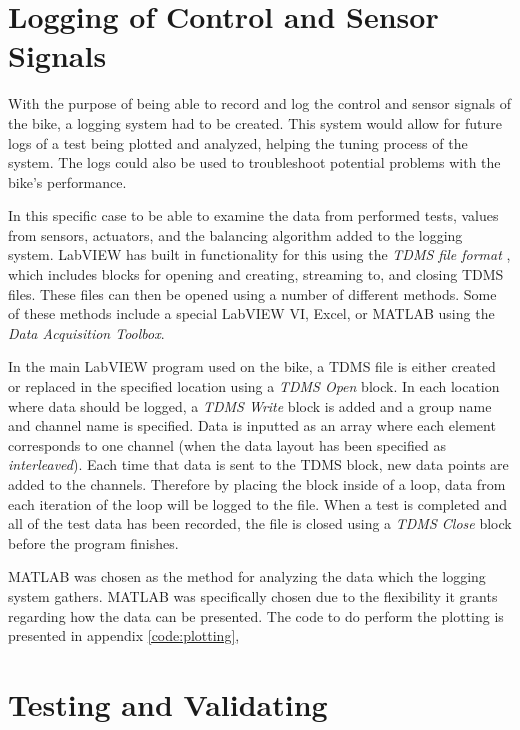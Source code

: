 \section{Logging of Control and Sensor Signals} \label{method:logging}

With the purpose of being able to record and log the control and sensor signals of the bike, a logging system had to be created. This system would allow for future logs of a test being plotted and analyzed, helping the tuning process of the system. The logs could also be used to troubleshoot potential problems with the bike's performance.

In this specific case to be able to examine the data from performed tests, values from sensors, actuators, and the balancing algorithm added to the logging system. LabVIEW has built in functionality for this using the \textit{TDMS file format} \cite{NationalInstruments2022TheFormat}, which includes blocks for opening and creating, streaming to, and closing TDMS files. These files can then be opened using a number of different methods. Some of these methods include a special LabVIEW VI, Excel, or MATLAB using the \textit{Data Acquisition Toolbox}. 

In the main LabVIEW program used on the bike, a TDMS file is either created or replaced in the specified location using a \textit{TDMS Open} block. In each location where data should be logged, a \textit{TDMS Write} block is added and a group name and channel name is specified. Data is inputted as an array where each element corresponds to one channel (when the data layout has been specified as \textit{interleaved}). Each time that data is sent to the TDMS block, new data points are added to the channels. Therefore by placing the block inside of a loop, data from each iteration of the loop will be logged to the file. When a test is completed and all of the test data has been recorded, the file is closed using a \textit{TDMS Close} block before the program finishes.

MATLAB was chosen as the method for analyzing the data which the logging system gathers. MATLAB was specifically chosen due to the flexibility it grants regarding how the data can be presented. The code to do perform the plotting is presented in appendix \ref{code:plotting},

\section{Testing and Validating}

